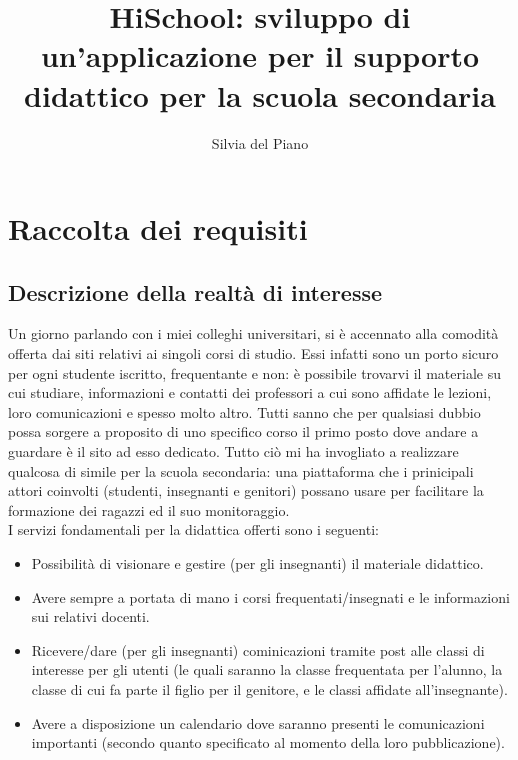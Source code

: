 \documentclass[Lau, binding=0.6cm]{sapthesis}
\title{HiSchool: sviluppo di un'applicazione per il supporto didattico per la scuola secondaria}
\author{Silvia del Piano}
\begin{document}
\frontmatter

\maketitle

\dedication{Da vedere}

\tableofcontents

\mainmatter

\chapter{Raccolta dei requisiti}

\section{Descrizione della realtà di interesse}

Un giorno parlando con i miei colleghi universitari, si è accennato alla comodità offerta dai siti relativi ai singoli corsi di studio. Essi infatti sono un porto sicuro per ogni studente iscritto, frequentante e non: è possibile trovarvi il materiale su cui studiare, informazioni e contatti dei professori a cui sono affidate le lezioni, loro comunicazioni e spesso molto altro. Tutti sanno che per qualsiasi dubbio possa sorgere a proposito di uno specifico corso il primo posto dove andare a guardare è il sito ad esso dedicato. Tutto ciò mi ha invogliato a realizzare qualcosa di simile per la scuola secondaria: una piattaforma che i prinicipali attori coinvolti (studenti, insegnanti e genitori) possano usare per facilitare la formazione dei ragazzi ed il suo monitoraggio.\\
I servizi fondamentali per la didattica offerti sono i seguenti:
\begin{itemize}
	\item Possibilità di visionare e gestire (per gli insegnanti) il materiale didattico.
	\item Avere sempre a portata di mano i corsi frequentati/insegnati e le informazioni sui relativi docenti.
	\item Ricevere/dare (per gli insegnanti) cominicazioni tramite post alle classi di interesse per gli utenti (le quali saranno la classe frequentata per l'alunno, la classe di cui fa parte il figlio per il genitore, e le classi affidate all'insegnante).
	\item Avere a disposizione un calendario dove saranno presenti le comunicazioni importanti (secondo quanto specificato al momento della loro pubblicazione).
\end{itemize}
\end{document}
